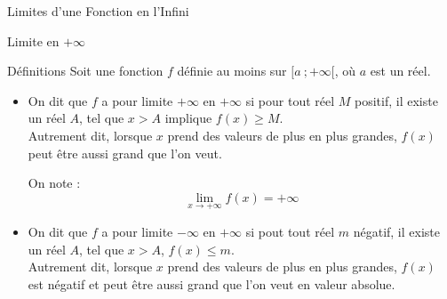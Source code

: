 \documentclass{coursbook}
\begin{document}
    \begin{Gpartie}{Limites d'une Fonction en l'Infini} 
        \begin{Spartie}{Limite en $+\infty$} 
            \begin{SSpartie}{Définitions} 
                Soit une fonction $f$ définie au moins sur $\big[a~;+\infty\big[$, où $a$ est un réel.

                \begin{itemize}
                    \item   On dit que $f$ a pour limite $+\infty$ en $+\infty$ si pour tout réel $M$ positif, il existe un réel $A$, tel que $x>A$ implique $f(x)\geq M$. \\ Autrement dit, lorsque $x$ prend des valeurs de plus en plus grandes, $f(x)$ peut être aussi grand que l'on veut.
                    
                    On note : \[\boxed{\lim\limits_{x\to +\infty}f(x)=+\infty}\] 
                    \begin{center}
                        \parbox{\linewidth}{}
                    \end{center}
                    \pagebreak
                    \item   On dit que $f$ a pour limite $-\infty$ en $+\infty$ si pout tout réel $m$ négatif, il existe un réel $A$, tel que $x>A$, $f(x)\leq m$. \\ Autrement dit, lorsque $x$ prend des valeurs de plus en plus grandes, $f(x)$ est négatif et peut être aussi grand que l'on veut en valeur absolue.
                    

\end{itemize}
\end{SSpartie}
\end{Spartie}
\end{Gpartie}
\end{document}
